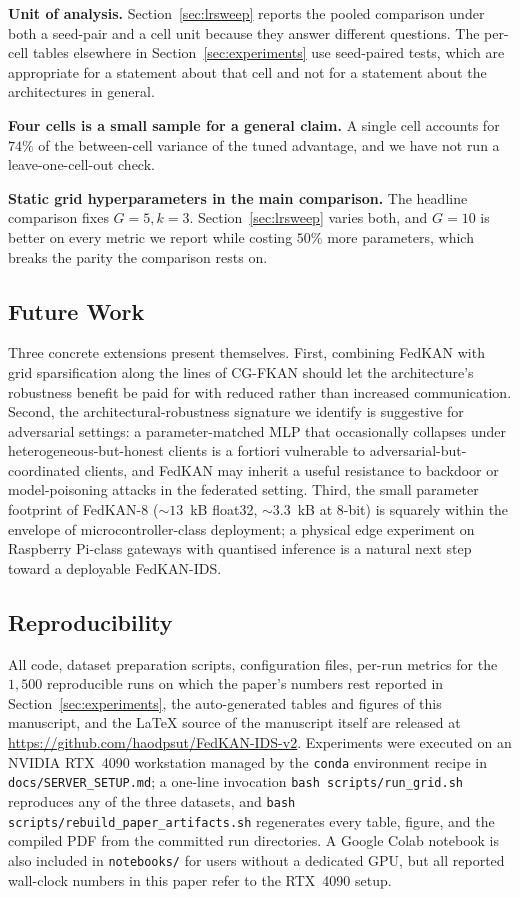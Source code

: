 \textbf{Unit of analysis.} Section~\ref{sec:lrsweep} reports the pooled comparison under both a
seed-pair and a cell unit because they answer different questions. The per-cell tables
elsewhere in Section~\ref{sec:experiments} use seed-paired tests, which are appropriate for a
statement about that cell and not for a statement about the architectures in general.

\textbf{Four cells is a small sample for a general claim.} A single cell accounts for $74\%$ of
the between-cell variance of the tuned advantage, and we have not run a leave-one-cell-out
check.

\textbf{Static grid hyperparameters in the main comparison.} The headline comparison fixes
$G=5, k=3$. Section~\ref{sec:lrsweep} varies both, and $G=10$ is better on every metric we
report while costing $50\%$ more parameters, which breaks the parity the comparison rests on.

\subsection{Future Work}

Three concrete extensions present themselves. First, combining FedKAN with grid sparsification along the lines of CG-FKAN \cite{yu2025cgfkan} should let the architecture's robustness benefit be paid for with reduced rather than increased communication. Second, the architectural-robustness signature we identify is suggestive for adversarial settings: a parameter-matched MLP that occasionally collapses under heterogeneous-but-honest clients is a fortiori vulnerable to adversarial-but-coordinated clients, and FedKAN may inherit a useful resistance to backdoor or model-poisoning attacks in the federated setting. Third, the small parameter footprint of FedKAN-8 ($\sim 13$~kB float32, $\sim 3.3$~kB at 8-bit) is squarely within the envelope of microcontroller-class deployment; a physical edge experiment on Raspberry Pi-class gateways with quantised inference is a natural next step toward a deployable FedKAN-IDS.

\subsection{Reproducibility}

All code, dataset preparation scripts, configuration files, per-run metrics for the $1{,}500$ reproducible runs on which the paper's numbers rest reported in Section~\ref{sec:experiments}, the auto-generated tables and figures of this manuscript, and the \LaTeX{} source of the manuscript itself are released at \url{https://github.com/haodpsut/FedKAN-IDS-v2}. Experiments were executed on an NVIDIA RTX~4090 workstation managed by the \texttt{conda} environment recipe in \texttt{docs/SERVER\_SETUP.md}; a one-line invocation \texttt{bash scripts/run\_grid.sh} reproduces any of the three datasets, and \texttt{bash scripts/rebuild\_paper\_artifacts.sh} regenerates every table, figure, and the compiled PDF from the committed run directories. A Google Colab notebook is also included in \texttt{notebooks/} for users without a dedicated GPU, but all reported wall-clock numbers in this paper refer to the RTX~4090 setup.
